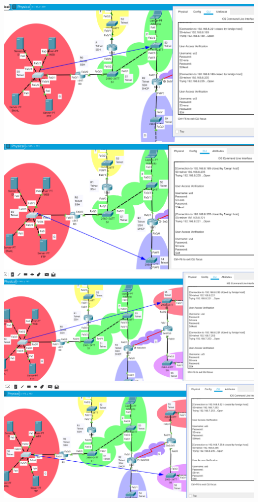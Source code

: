 \documentclass{article}
\begin{document}
\begin{enumerate}[label=\textbf{\arabic*.}]
  \includegraphics[width=0.8\linewidth]{telnet-s0-s3.png}\\[3mm]
  \includegraphics[width=0.8\linewidth]{telnet-s0-s4.png}\\[3mm]
  \includegraphics[width=0.8\linewidth]{telnet-s0-s5.png}\\[3mm]
  \includegraphics[width=0.8\linewidth]{telnet-s0-s6.png}\\[2cm]
  

\end{enumerate}
\end{document}
